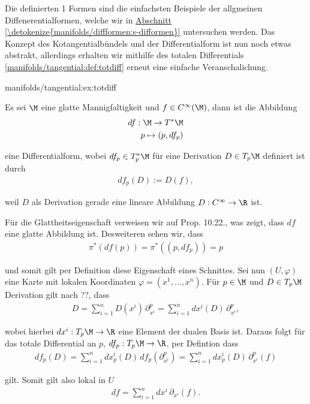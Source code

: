\documentclass[letterpaper,10pt,german]{jupyterBook}
\begin{document}
\par
Die definierten 1 Formen sind die einfachsten Beispiele der allgmeinen Diffenerentialformen, welche wir in \hyperref[\detokenize{manifolds/diffformen:s-difformen}]{Abschnitt \ref{\detokenize{manifolds/diffformen:s-difformen}}} untersuchen werden. Das Konzept des Kotangentialbündels und der Differentialform ist nun noch etwas abstrakt, allerdings erhalten wir mithilfe des totalen Differentials \cref{manifolds/tangential:def:totdiff} erneut eine einfache Veranschalichung.
\begin{example}{}{manifolds/tangential:ex:totdiff}



\par
Es sei \(\M\) eine glatte Mannigfaltigkeit und \(f\in C^\infty(\M)\), dann ist die Abbildung
\begin{align*}
df:\M\to T^\ast\M\\
p\mapsto (p, df_p)
\end{align*}
\par
eine Differentialform, wobei \(df_p\in T_p^\ast\M\) für eine Derivation \(D\in T_p\M\) definiert ist durch
\begin{align*}
df_p(D) := D(f),
\end{align*}
\par
weil \(D\) als Derivation gerade eine lineare Abbildung \(D:C^\infty\to\R\) ist.

\par
Für die Glattheitseigenschaft verweisen wir auf \cite{Lee03} Prop. 10.22., was zeigt, dass \(df\) eine glatte Abbildung ist. Desweiteren sehen wir, dass
\begin{align*}
\pi^\ast(df(p)) = \pi^\ast((p,df_p)) = p\end{align*}
\par
und somit gilt per Definition diese Eigenschaft eines Schnittes. Sei nun \((U,\varphi)\) eine Karte mit lokalen Koordinaten \(\varphi = (x^1,\ldots, x^n)\). Für \(p\in\M\) und \(D\in T_p\M\) Derivation gilt nach ??, dass
\begin{align*}
D = \sum_{i=1}^n D(x^i)\, \partial_{x^i}^p = \sum_{i=1}^n dx^{i}(D)\, \partial_{x^i}^p,
\end{align*}
\par
wobei hierbei \(dx^{i}:T_p\M\to\R\) eine Element der dualen Basis ist. Daraus folgt für das totale Differential an \(p\), \(df_p:T_p\M\to\R\), per Defintion dass
\begin{align*}
df_p(D) = \sum_{i=1}^n dx_p^{i}(D)\, df_p(\partial_{x^i}^p) = 
\sum_{i=1}^n dx_p^{i}(D)\, \partial_{x^i}^p(f)
\end{align*}
\par
gilt. Somit gilt also lokal in \(U\)
\begin{align*}
df = \sum_{i=1}^n dx^{i}\, \partial_{x^i}(f).
\end{align*}\end{example}
\end{document}
